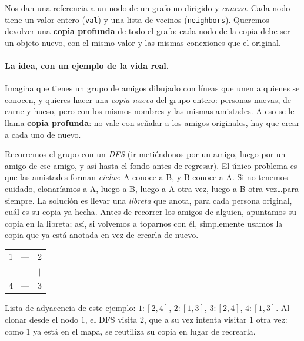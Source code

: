 
Nos dan una referencia a un nodo de un grafo no dirigido y \emph{conexo}.
Cada nodo tiene un valor entero (\texttt{val}) y una lista de vecinos
(\texttt{neighbors}). Queremos devolver una \textbf{copia profunda} de todo
el grafo: cada nodo de la copia debe ser un objeto nuevo, con el mismo valor
y las mismas conexiones que el original.

\paragraph{La idea, con un ejemplo de la vida real.} Imagina que tienes un
grupo de amigos dibujado con líneas que unen a quienes se conocen, y quieres
hacer una \emph{copia nueva} del grupo entero: personas nuevas, de carne y
hueso, pero con los mismos nombres y las mismas amistades. A eso se le llama
\textbf{copia profunda}: no vale con señalar a los amigos originales, hay que
crear a cada uno de nuevo.

Recorremos el grupo con un \emph{DFS} (ir metiéndonos por un amigo, luego por
un amigo de ese amigo, y así hasta el fondo antes de regresar). El único
problema es que las amistades forman \emph{ciclos}: A conoce a B, y B conoce a
A. Si no tenemos cuidado, clonaríamos a A, luego a B, luego a A otra vez,
luego a B otra vez\ldots para siempre. La solución es llevar una
\emph{libreta} que anota, para cada persona original, cuál es su copia ya
hecha. Antes de recorrer los amigos de alguien, apuntamos su copia en la
libreta; así, si volvemos a toparnos con él, simplemente usamos la copia que
ya está anotada en vez de crearla de nuevo.

\begin{center}
\ttfamily
\begin{tabular}{ccc}
1 & --- & 2\\
$|$ & & $|$\\
4 & --- & 3\\
\end{tabular}
\end{center}

\noindent Lista de adyacencia de este ejemplo: $1:[2,4]$, $2:[1,3]$,
$3:[2,4]$, $4:[1,3]$. Al clonar desde el nodo $1$, el DFS visita $2$, que a
su vez intenta visitar $1$ otra vez: como $1$ ya está en el mapa, se
reutiliza su copia en lugar de recrearla.

